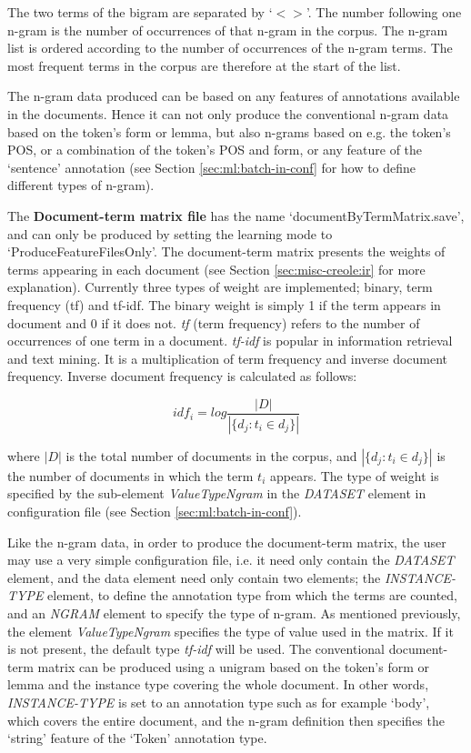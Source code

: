The two terms of the bigram are separated by `$<>$'. The number following one
n-gram is the number of occurrences of that n-gram in the corpus. The n-gram list
is ordered according to the number of occurrences of the n-gram terms. The most
frequent terms in the corpus are therefore at the start of the list.

The n-gram data produced can be based on any features of annotations available in
the documents. Hence it can not only produce the conventional n-gram data based
on the token's form or lemma, but also n-grams based on e.g. the token's POS, or
a combination of the token's POS and form, or any feature of the `sentence'
annotation (see Section \ref{sec:ml:batch-in-conf} for how to define different types
of n-gram).

The {\bf Document-term matrix file} has the name `documentByTermMatrix.save',
and can only be produced by setting the learning mode to
`ProduceFeatureFilesOnly'. The document-term matrix presents the weights of
terms appearing in each document (see Section \ref{sec:misc-creole:ir} for more
explanation). Currently three types of weight are implemented; binary, term
frequency (tf) and tf-idf.  The binary weight is simply 1 if the term appears in
document and 0 if it does not. {\em tf} (term frequency) refers to the number of
occurrences of one term in a document. {\em tf-idf} is popular in information
retrieval and text mining. It is a multiplication of term frequency and inverse
document frequency. Inverse document frequency is calculated as follows:

\[ idf_{i} = log\frac{|D|}{|\{d_{j}:t_{i}\in d_{j}\}|} \]

where $|D|$ is the total number of
documents in the corpus, and $|\{d_{j}:t_{i}\in d_{j}\}|$ is the number of
documents in which the term $t_{i}$ appears. The type of weight is specified by
the sub-element {\em ValueTypeNgram} in the {\em DATASET} element in
configuration file (see Section \ref{sec:ml:batch-in-conf}).

Like the n-gram data, in order to produce the document-term matrix, the user may
use a very simple configuration file, i.e. it need only contain the {\em DATASET}
element, and the data element need only contain two elements; the {\em
INSTANCE-TYPE} element, to define the annotation type from which the terms are
counted, and an {\em NGRAM} element to specify the type of n-gram. As mentioned
previously, the element {\em ValueTypeNgram} specifies the type of value used in
the matrix. If it is not present, the default type {\em tf-idf} will be used. The
conventional document-term matrix can be produced using a unigram based on the
token's form or lemma and the instance type covering the whole document. In other
words, {\em INSTANCE-TYPE} is set to an annotation type such as for example
`body', which covers the entire document, and the n-gram definition then
specifies the `string' feature of the `Token' annotation type.

